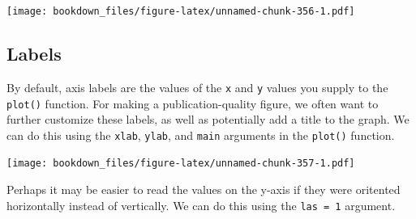 \documentclass[]{krantz}
\makeatletter
\newenvironment{Shaded}{\begin{snugshade}}{\end{snugshade}}
\newcommand{\KeywordTok}[1]{\textcolor[rgb]{0.27,0.27,0.27}{\textbf{#1}}}
\newcommand{\DataTypeTok}[1]{\textcolor[rgb]{0.27,0.27,0.27}{#1}}
\newcommand{\DecValTok}[1]{\textcolor[rgb]{0.06,0.06,0.06}{#1}}
\newcommand{\StringTok}[1]{\textcolor[rgb]{0.5,0.5,0.5}{#1}}
\newcommand{\OperatorTok}[1]{\textcolor[rgb]{0.43,0.43,0.43}{\textbf{#1}}}
\newcommand{\NormalTok}[1]{#1}
\newenvironment{kframe}{%
\medskip{}
\setlength{\fboxsep}{.8em}
 \def\at@end@of@kframe{}%
 \ifinner\ifhmode%
  \def\at@end@of@kframe{\end{minipage}}%
  \begin{minipage}{\columnwidth}%
 \fi\fi%
 \def\FrameCommand##1{\hskip\@totalleftmargin \hskip-\fboxsep
 \colorbox{shadecolor}{##1}\hskip-\fboxsep
     \hskip-\linewidth \hskip-\@totalleftmargin \hskip\columnwidth}%
 \MakeFramed {\advance\hsize-\width
   \@totalleftmargin\z@ \linewidth\hsize
   \@setminipage}}%
 {\par\unskip\endMakeFramed%
 \at@end@of@kframe}
\renewenvironment{Shaded}{\begin{kframe}}{\end{kframe}}
\makeatother
\begin{document}
\begin{Shaded}
\end{Shaded}

\texttt{[image: bookdown\_files/figure-latex/unnamed-chunk-356-1.pdf]}

\subsection{Labels}\label{labels-1}

By default, axis labels are the values of the \texttt{x} and \texttt{y}
values you supply to the \texttt{plot()} function. For making a
publication-quality figure, we often want to further customize these
labels, as well as potentially add a title to the graph. We can do this
using the \texttt{xlab}, \texttt{ylab}, and \texttt{main} arguments in
the \texttt{plot()} function.

\begin{Shaded}
\end{Shaded}

\texttt{[image: bookdown\_files/figure-latex/unnamed-chunk-357-1.pdf]}

Perhaps it may be easier to read the values on the y-axis if they were
oritented horizontally instead of vertically. We can do this using the
\texttt{las\ =\ 1} argument.

\begin{Shaded}
\end{Shaded}
\end{document}
